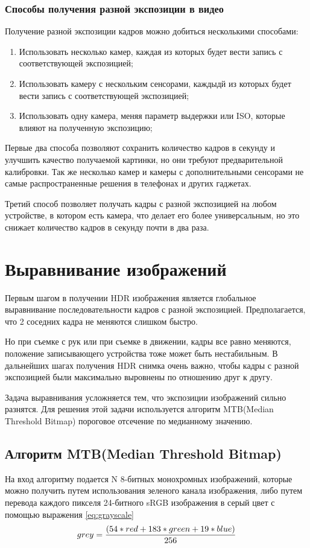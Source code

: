 \subsubsection{ Способы получения разной экспозиции в видео}
    Получение разной экспозиции кадров можно добиться несколькими способами:
\begin{enumerate}
    \item Использовать несколько камер, каждая из которых будет вести запись с соответствующей экспозицией;
    \item Использовать камеру с нескольким сенсорами, каждыдй из которых будет вести запись с соответствующей экспозицией;
    \item Использовать одну камера, меняя параметр выдержки или ISO, которые влияют на полученную экспозицию;
\end{enumerate}

    Первые два способа позволяют сохранить количество кадров в секунду и улучшить качество получаемой картинки, но они требуют предварительной калибровки. Так же несколько камер и камеры с дополнительными сенсорами не самые распространенные решения в телефонах и других гаджетах.
    
    Третий способ позволяет получать кадры с разной экспозицией на любом устройстве, в котором есть камера, что делает его более универсальным, но это снижает количество кадров в секунду почти в два раза.

\section{ Выравнивание изображений}
    Первым шагом в получении HDR изображения является глобальное выравнивание последовательности кадров с разной экспозицией. Предполагается, что 2 соседних кадра не меняются слишком быстро.

    Но при съемке с рук или при съемке в движении, кадры все равно меняются, положение записывающего устройства тоже может быть нестабильным. В дальнейших шагах получения HDR снимка очень важно, чтобы кадры с разной экспозицией были максимально выровнены по отношению друг к другу. 

    Задача выравнивания усложняется тем, что экспозиции изображений сильно разнятся. Для решения этой задачи используется алгоритм MTB(Median Threshold Bitmap) пороговое отсечение по медианному значению.

\subsection{ Алгоритм MTB(Median Threshold Bitmap)}
    На вход алгоритму подается N 8-битных монохромных изображений, которые можно получить путем использования зеленого канала изображения, либо путем перевода каждого пикселя 24-битного sRGB изображения в серый цвет с помощью выражения \ref{eq:grayscale}
\begin{equation}
    \centering{
        grey = \frac{(54*red + 183*green + 19*blue)}{256}}
    \label{eq:grayscale}
\end{equation}

